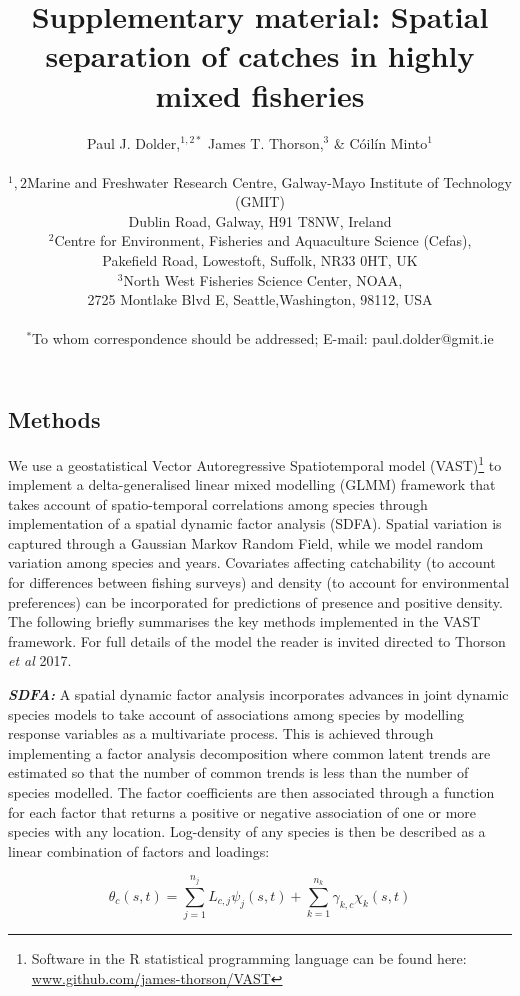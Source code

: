 \documentclass[12pt]{article}
\title{Supplementary material:  Spatial separation of catches in highly mixed fisheries}
\author
{Paul J. Dolder,$^{1,2\ast}$ James T. Thorson,$^3$ \& Cóilín Minto$^1$\\
\\
\normalsize{$^1,2$Marine and Freshwater Research Centre, Galway-Mayo Institute of
	Technology (GMIT)}\\
\normalsize{Dublin Road, Galway, H91 T8NW, Ireland}\\
\normalsize{$^2$Centre for Environment, Fisheries and Aquaculture Science
	(Cefas),}\\
\normalsize{Pakefield Road, Lowestoft, Suffolk, NR33 0HT, UK}\\
\normalsize{$^3$North West Fisheries Science Center, NOAA,}\\
\normalsize{2725 Montlake Blvd E, Seattle,Washington, 98112, USA}\\
\\
\normalsize{$^\ast$To whom correspondence should be addressed; E-mail:
	paul.dolder@gmit.ie}
}
\date{}
\newcommand{\beginsupplement}{%
		        \setcounter{table}{0}
		        \renewcommand{\thetable}{S\arabic{table}}%
		        \setcounter{figure}{0}
		        \renewcommand{\thefigure}{S\arabic{figure}}%
			     }
\begin{document}
\baselineskip24pt

\beginsupplement

\maketitle

\begin{linenumbers}

\section*{Methods}

We use a geostatistical Vector Autoregressive Spatiotemporal model
	(VAST)\footnote{Software in the R statistical programming language can
	be found here: \url{www.github.com/james-thorson/VAST}} to implement a
delta-generalised linear mixed modelling (GLMM) framework that takes account of
spatio-temporal correlations among species through implementation of a spatial
dynamic factor analysis (SDFA). Spatial variation is captured through a
Gaussian Markov Random Field, while we model random variation among species and
years. Covariates affecting catchability (to account for differences between
fishing surveys) and density (to account for environmental preferences) can be
incorporated for predictions of presence and positive density. The following
briefly summarises the key methods implemented in the VAST framework. For full
details of the model the reader is invited directed to Thorson \textit{et al}
2017\cite{Thorson2017}.

\textbf{\textit{SDFA:}} A spatial dynamic factor analysis incorporates advances
in joint dynamic species models\cite{Thorson2017} to take account of
associations among species by modelling response variables as a multivariate
process. This is achieved through implementing a factor analysis decomposition
where common latent trends are estimated so that the number of common trends is
less than the number of species modelled. The factor coefficients are then
associated through a function for each factor that returns a positive or
negative association of one or more species with any location. Log-density of
any species is then be described as a linear combination of factors and
loadings: 

\begin{equation} \theta_{c}(s,t) = \sum_{j=1}^{n_{j}}
	L_{c,j}\psi_{j}(s,t) +\sum_{k=1}^{n_{k}} \gamma_{k,c}\chi_{k}(s,t)
\end{equation} 


\end{linenumbers}
\end{document}
